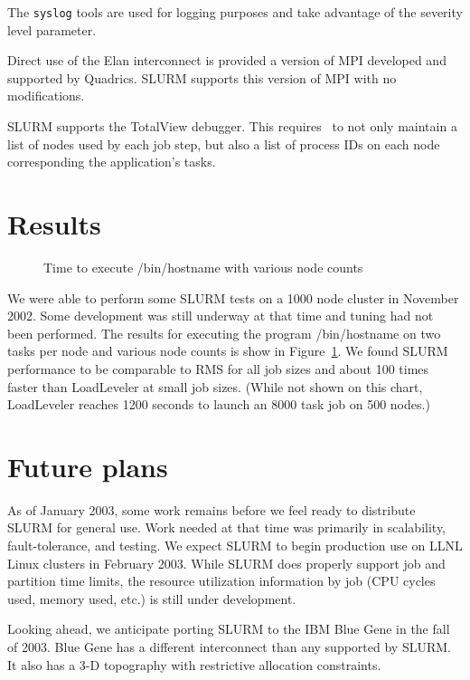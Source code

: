 The {\tt syslog} tools are used for logging purposes and take advantage of the 
severity level parameter.

Direct use of the Elan interconnect is provided a version of MPI developed 
and supported by Quadrics. SLURM supports this version of MPI with no modifications. 

SLURM supports the TotalView debugger\cite{Etnus2002}. 
This requires \srun\ to not only maintain a list of nodes used by each 
job step, but also a list of process IDs on each node corresponding 
the application's tasks.

\section{Results}

\begin{figure}[htb]
\centerline{}
\caption{Time to execute /bin/hostname with various node counts}
\label{timing}
\end{figure}

We were able to perform some SLURM tests on a 1000 node cluster in November
2002. Some development was still underway at that time and tuning had not been 
performed. The results for executing the program /bin/hostname on two tasks 
per node and various node counts is show in Figure~\ref{timing}. 
We found SLURM performance to be comparable to RMS for all job 
sizes and about 100 times faster than LoadLeveler at small job sizes.
(While not shown on this chart, LoadLeveler reaches 1200 seconds to 
launch an 8000 task job on 500 nodes.)

\section{Future plans}

As of January 2003, some work remains before we feel ready to 
distribute SLURM for general use. Work needed at that time was 
primarily in scalability, fault-tolerance, and testing. 
We expect SLURM to begin production use on LLNL Linux clusters 
in February 2003.
While SLURM does properly support job and partition time limits, 
the resource utilization information by job (CPU cycles used, 
memory used, etc.) is still under development. 

Looking ahead, we anticipate porting SLURM to the  
IBM Blue Gene\cite{BlueGene2002}
in the fall of 2003. 
Blue Gene has a different interconnect than any supported 
by SLURM. 
It also has a 3-D topography with restrictive allocation constraints.

